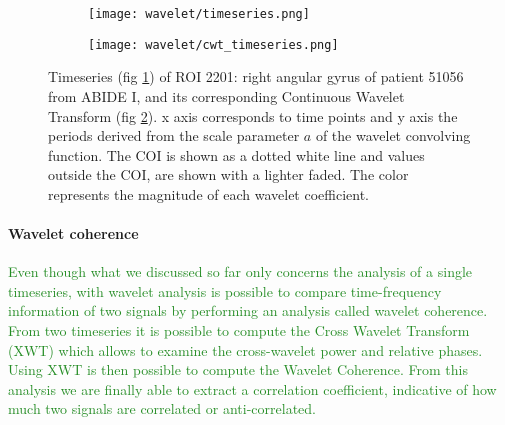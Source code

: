 \documentclass[11pt]{report}
\begin{document}
\begin{figure}
\begin{subfigure}{0.5\textwidth}
\texttt{[image: wavelet/timeseries.png]}
\caption{}
\label{fig:timeseries_cwt}
\end{subfigure}
\begin{subfigure}{0.5\textwidth}
\texttt{[image: wavelet/cwt\_timeseries.png]}
\caption{}
\label{fig:cwt}
\end{subfigure}
\caption{Timeseries (fig \ref{fig:timeseries_cwt}) of ROI 2201: right angular gyrus of patient 51056 from ABIDE I, and its corresponding Continuous Wavelet Transform  (fig \ref{fig:cwt}).
x axis corresponds to time points and y axis the periods derived from the scale parameter $a$ of the wavelet convolving function.
The COI is shown as a dotted white line and values outside the COI, are shown with a lighter faded.
The color represents the magnitude of each wavelet coefficient.}
\label{fig:cwt_timeseries}
\end{figure}



\paragraph{Wavelet coherence} \hfill \newline
\textcolor{ForestGreen}{
Even though what we discussed so far only concerns the analysis of a single timeseries, with wavelet analysis is possible to compare time-frequency information of two signals by performing an analysis called wavelet coherence.
From two timeseries it is possible to compute the Cross Wavelet Transform (XWT) which allows to examine the cross-wavelet power and relative phases.
Using XWT is then possible to compute the Wavelet Coherence.
From this analysis we are finally able to extract a correlation coefficient, indicative of how much two signals are correlated or anti-correlated.
}
\end{document}

